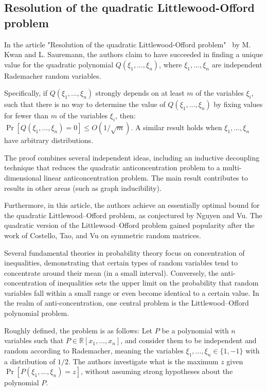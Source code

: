 \subsection{Resolution of the quadratic Littlewood-Offord problem}


In the article "Resolution of the quadratic Littlewood-Offord problem"~\cite{kwan2023resolution} by M. Kwan and L. Sauremann, the authors claim to have succeeded in finding a unique value for the quadratic polynomial $Q(\xi_1,\ldots,\xi_n)$, where $\xi_1,\ldots,\xi_n$ are independent Rademacher random variables.
 
Specifically, if $Q(\xi_1,\ldots,\xi_n)$ strongly depends on at least $m$ of the variables $\xi_i$, such that there is no way to determine the value of $Q(\xi_1,\ldots,\xi_n)$ by fixing values for fewer than $m$ of the variables $\xi_i$, then:
$\Pr[Q(\xi_1,\ldots,\xi_n) = 0] \leq O(1/\sqrt{m})$. A similar result holds when $\xi_1,\ldots,\xi_n$ have arbitrary distributions.
 
The proof combines several independent ideas, including an inductive decoupling technique that reduces the quadratic anticoncentration problem to a multi-dimensional linear anticoncentration problem.
\newline
The main result contributes to results in other areas (such as graph inducibility).
 
Furthermore, in this article, the authors achieve an essentially optimal bound for the quadratic Littlewood–Offord problem, as conjectured by Nguyen and Vu. The quadratic version of the Littlewood–Offord problem gained popularity after the work of Costello, Tao, and Vu on symmetric random matrices.
 
Several fundamental theories in probability theory focus on concentration of inequalities, demonstrating that certain types of random variables tend to concentrate around their mean (in a small interval). Conversely, the anti-concentration of inequalities sets the upper limit on the probability that random variables fall within a small range or even become identical to a certain value. In the realm of anti-concentration, one central problem is the Littlewood–Offord polynomial problem.
 
Roughly defined, the problem is as follows: Let $P$ be a polynomial with $n$ variables such that $P \in \mathbb{R}[x_1,\ldots,x_n]$, and consider them to be independent and random according to Rademacher, meaning the variables $\xi_1,\ldots,\xi_n \in \{1,-1\}$ with a distribution of $1/2$. The authors investigate what is the maximum $z$ given $\Pr[P(\xi_1,\ldots,\xi_n) = z]$, without assuming strong hypotheses about the polynomial $P$.
 
